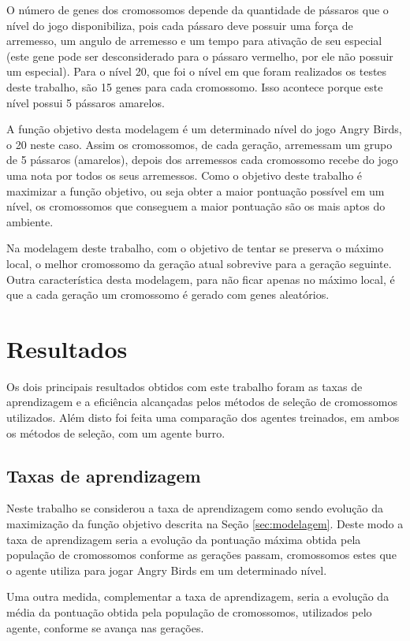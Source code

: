 \documentclass[10pt,a4paper]{article}
\begin{document}
O número de genes dos cromossomos depende da quantidade de pássaros que o nível do jogo disponibiliza, pois cada pássaro deve possuir uma força de arremesso, um angulo de arremesso e um tempo para ativação de seu especial (este gene pode ser desconsiderado para o pássaro vermelho, por ele não possuir um especial). Para o nível 20, que foi o nível em que foram realizados os testes deste trabalho, são 15 genes para cada cromossomo. Isso acontece porque este  nível possui 5 pássaros amarelos. 

A função objetivo desta modelagem é um determinado nível do jogo Angry Birds, o 20 neste caso. Assim os cromossomos, de cada geração, arremessam um grupo de 5 pássaros (amarelos), depois dos arremessos cada cromossomo recebe do jogo uma nota por todos os seus arremessos. Como o objetivo deste trabalho é maximizar a função objetivo, ou seja obter a maior pontuação possível em um nível, os cromossomos que conseguem a maior pontuação são os mais aptos do ambiente. 

 Na modelagem deste trabalho, com o objetivo de tentar se preserva o máximo local, o melhor  cromossomo da geração atual sobrevive para a geração seguinte. Outra característica desta modelagem, para não ficar apenas no máximo local, é que a cada geração um cromossomo é gerado com genes aleatórios.
 
\section{Resultados}
Os dois principais resultados obtidos com este trabalho foram as taxas de aprendizagem e a eficiência alcançadas pelos métodos de seleção de cromossomos utilizados. Além disto foi feita uma comparação dos agentes treinados, em ambos os métodos de seleção, com um agente burro. 

\subsection{Taxas de aprendizagem} 
Neste trabalho se considerou a taxa de aprendizagem como sendo evolução da maximização da função objetivo descrita na Seção \ref{sec:modelagem}. Deste modo a taxa de aprendizagem seria a evolução da pontuação máxima obtida pela população de cromossomos conforme as gerações passam, cromossomos estes que o agente utiliza para jogar Angry Birds em um determinado nível. 

Uma outra medida, complementar a taxa de aprendizagem, seria a evolução da média da pontuação obtida pela população de cromossomos, utilizados pelo agente, conforme se avança nas gerações. 
\end{document}

